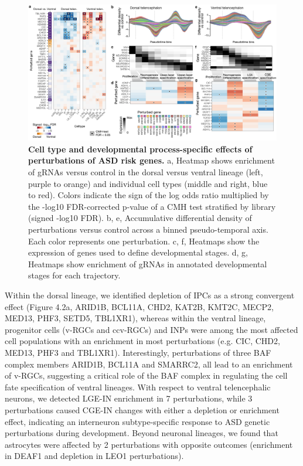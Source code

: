 \begin{figure}[t!]
    \centering
	\includegraphics[width=\textwidth]{figures/asd/Figure_2}
    \caption{\textbf{Cell type and developmental process-specific effects of perturbations of ASD risk genes.}
    a, Heatmap shows enrichment of gRNAs versus control in the dorsal versus ventral lineage (left, purple to orange) and individual cell types (middle and right, blue to red). Colors indicate the sign of the log odds ratio multiplied by the -log10 FDR-corrected p-value of a CMH test stratified by library (signed -log10 FDR). b, e, Accumulative differential density of perturbations versus control across a binned pseudo-temporal axis. Each color represents one perturbation. c, f, Heatmaps show the expression of genes used to define developmental stages. d, g, Heatmaps show enrichment of gRNAs in annotated developmental stages for each trajectory.}
    \label{fig:asd2}
\end{figure}

Within the dorsal lineage, we identified depletion of IPCs as a strong convergent effect (Figure 4.2a, ARID1B, BCL11A, CHD2, KAT2B, KMT2C, MECP2, MED13, PHF3, SETD5, TBL1XR1), whereas within the ventral lineage, progenitor cells (v-RGCs and ccv-RGCs) and INPs were among the most affected cell populations with an enrichment in most perturbations (e.g. CIC, CHD2, MED13, PHF3 and TBL1XR1). Interestingly, perturbations of three BAF complex members ARID1B, BCL11A and SMARRC2, all lead to an enrichment of v-RGCs, suggesting a critical role of the BAF complex in regulating the cell fate specification of ventral lineages. With respect to ventral telencephalic neurons, we detected LGE-IN enrichment in 7 perturbations, while 3 perturbations caused CGE-IN changes with either a depletion or enrichment effect, indicating an interneuron subtype-specific response to ASD genetic perturbations during development. Beyond neuronal lineages, we found that astrocytes were affected by 2 perturbations with opposite outcomes (enrichment in DEAF1 and depletion in LEO1 perturbations). 

